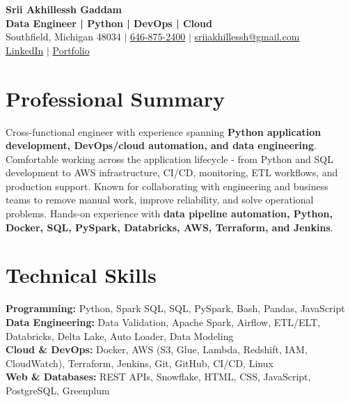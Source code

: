 \documentclass[letterpaper,10pt]{article}
\begin{document}
\fontsize{9.35pt}{10.45pt}\selectfont

\begin{center}
    {\LARGE \textbf{Srii Akhillessh Gaddam}} \\[-1pt]
    \textbf{Data Engineer | Python | DevOps | Cloud} \\[2pt]
    Southfield, Michigan 48034 $|$
    \href{tel:6468752400}{646-875-2400} $|$
    \href{mailto:sriiakhillessh@gmail.com}{sriiakhillessh@gmail.com} \\[1pt]
    \href{https://www.linkedin.com/in/srii-akhiilessh-gaddam-b48668191/}{LinkedIn} $|$
    \href{https://sriiakhillesshg.github.io/portfolio/}{Portfolio}
\end{center}
\vspace{-8pt}

\section{Professional Summary}
\small{Cross-functional engineer with experience spanning \textbf{Python application development, DevOps/cloud automation, and data engineering}. Comfortable working across the application lifecycle - from Python and SQL development to AWS infrastructure, CI/CD, monitoring, ETL workflows, and production support. Known for collaborating with engineering and business teams to remove manual work, improve reliability, and solve operational problems. Hands-on experience with \textbf{data pipeline automation, Python, Docker, SQL, PySpark, Databricks, AWS, Terraform, and Jenkins}.}

\section{Technical Skills}
\small{
\textbf{Programming:} Python, Spark SQL, SQL, PySpark, Bash, Pandas, JavaScript \\
\textbf{Data Engineering:} Data Validation, Apache Spark, Airflow, ETL/ELT, Databricks, Delta Lake, Auto Loader, Data Modeling \\
\textbf{Cloud \& DevOps:} Docker, AWS (S3, Glue, Lambda, Redshift, IAM, CloudWatch), Terraform, Jenkins, Git, GitHub, CI/CD, Linux \\
\textbf{Web \& Databases:} REST APIs, Snowflake, HTML, CSS, JavaScript, PostgreSQL, Greenplum
}

\end{document}
